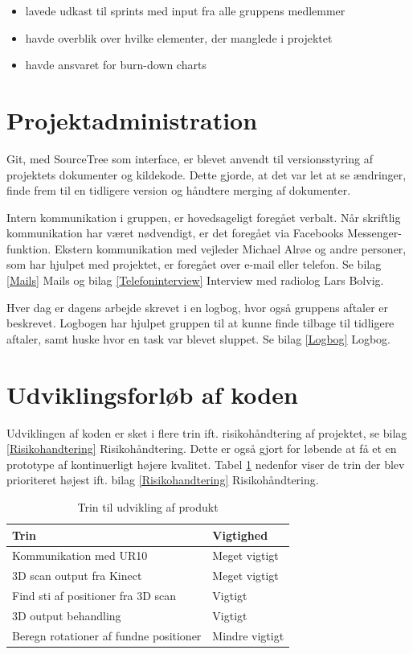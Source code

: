 \let\labelitemi\labelitemii
\begin{itemize}
\item lavede udkast til sprints med input fra alle gruppens medlemmer
\item havde overblik over hvilke elementer, der manglede i projektet
\item havde ansvaret for burn-down charts
\end{itemize} 

\section{Projektadministration}
Git, med SourceTree som interface, er blevet anvendt til versionsstyring af projektets dokumenter og kildekode. Dette gjorde, at det var let at se ændringer, finde frem til en tidligere version og håndtere merging af dokumenter.

Intern kommunikation i gruppen, er hovedsageligt foregået verbalt. Når skriftlig kommunikation har været nødvendigt, er det foregået via Facebooks Messenger-funktion. Ekstern kommunikation med vejleder Michael Alrøe og andre personer, som har hjulpet med projektet, er foregået over e-mail eller telefon. Se bilag \ref{Mails} Mails og bilag \ref{Telefoninterview} Interview med radiolog Lars Bolvig.  

Hver dag er dagens arbejde skrevet i en logbog, hvor også gruppens aftaler er beskrevet. Logbogen har hjulpet gruppen til at kunne finde tilbage til tidligere aftaler, samt huske hvor en task var blevet sluppet. Se bilag \ref{Logbog} Logbog.  

\newpage

\section{Udviklingsforløb af koden}
Udviklingen af koden er sket i flere trin ift. risikohåndtering af projektet, se bilag \ref{Risikohandtering} Risikohåndtering. Dette er også gjort for løbende at få et en prototype af kontinuerligt højere kvalitet.
Tabel \ref{prioriteringstrin} nedenfor viser de trin der blev prioriteret højest ift. bilag \ref{Risikohandtering} Risikohåndtering.

\begin{table}[h]
\centering
\begin{tabular}{|l| p{}|}
\hline
\textbf{Trin} &  \textbf{Vigtighed} \\\hline
	Kommunikation med UR10 & Meget vigtigt \\\hline
	3D scan output fra Kinect & Meget vigtigt\\\hline
	Find sti af positioner fra 3D scan & Vigtigt \\\hline
	3D output behandling & Vigtigt \\\hline
	Beregn rotationer af fundne positioner & Mindre vigtigt \\\hline
\end{tabular}
\caption{Trin til udvikling af produkt}
\label{prioriteringstrin}
\end{table}

